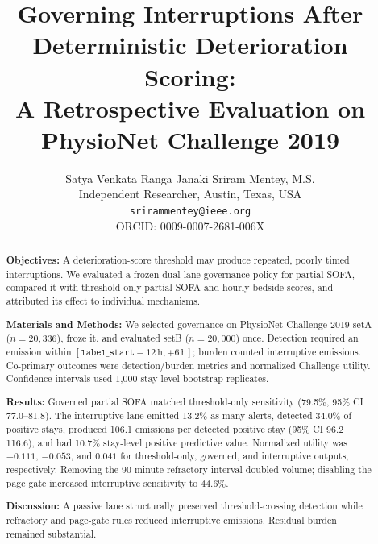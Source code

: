 \documentclass[11pt]{article}
\title{Governing Interruptions After Deterministic Deterioration Scoring:\\
A Retrospective Evaluation on PhysioNet Challenge 2019}
\author{Satya Venkata Ranga Janaki Sriram Mentey, M.S.\\
Independent Researcher, Austin, Texas, USA\\
\texttt{srirammentey@ieee.org}\\ORCID: 0009-0007-2681-006X}
\date{}
\begin{document}
\singlespacing
\maketitle
\thispagestyle{empty}

{\footnotesize{}
\begin{abstract}
\noindent\textbf{Objectives:} A deterioration-score threshold may produce
repeated, poorly timed interruptions. We evaluated a frozen dual-lane governance
policy for partial SOFA, compared it with threshold-only partial SOFA and hourly
bedside scores, and attributed its effect to individual mechanisms.

\noindent\textbf{Materials and Methods:} We selected governance on PhysioNet
Challenge 2019 setA ($n=20{,}336$), froze it, and evaluated setB ($n=20{,}000$)
once. Detection required an emission within
$[\texttt{label\_start}-12\,\mathrm{h},+6\,\mathrm{h}]$; burden counted
interruptive emissions. Co-primary outcomes were detection/burden metrics and
normalized Challenge utility. Confidence intervals used 1,000 stay-level
bootstrap replicates.

\noindent\textbf{Results:} Governed partial SOFA matched threshold-only
sensitivity (79.5\%, 95\% CI 77.0--81.8). The interruptive lane emitted 13.2\%
as many alerts, detected 34.0\% of positive stays, produced 106.1 emissions per
detected positive stay (95\% CI 96.2--116.6), and had 10.7\% stay-level positive
predictive value. Normalized utility was $-0.111$, $-0.053$, and $0.041$ for
threshold-only, governed, and interruptive outputs, respectively. Removing the
90-minute refractory interval doubled volume; disabling the page gate increased
interruptive sensitivity to 44.6\%.

\noindent\textbf{Discussion:} A passive lane structurally preserved
threshold-crossing detection while refractory and page-gate rules reduced
interruptive emissions. Residual burden remained substantial.


\end{abstract}}
\end{document}
